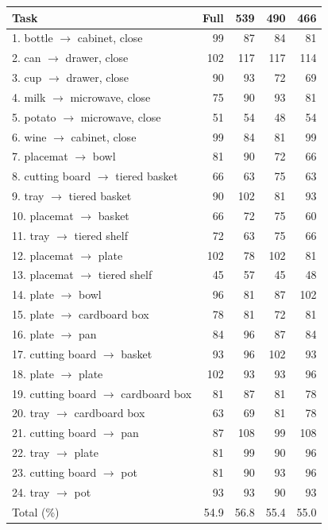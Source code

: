   \vspace{4pt}
  \begin{subtable}[t]{\linewidth}
    \centering
    \caption{RoboCasa-GR1 (DiT4DiT):150 episodes per task, three seeds evaluated.}
    \begin{tabular}{@{}lrrrr@{}}
    \toprule
    Task & Full & 539 & 490 & 466 \\
    \midrule
1. bottle $\rightarrow$ cabinet, close & 99 & 87 & 84 & 81 \\
2. can $\rightarrow$ drawer, close & 102 & 117 & 117 & 114 \\
3. cup $\rightarrow$ drawer, close & 90 & 93 & 72 & 69 \\
4. milk $\rightarrow$ microwave, close & 75 & 90 & 93 & 81 \\
5. potato $\rightarrow$ microwave, close & 51 & 54 & 48 & 54 \\
6. wine $\rightarrow$ cabinet, close & 99 & 84 & 81 & 99 \\
7. placemat $\rightarrow$ bowl & 81 & 90 & 72 & 66 \\
8. cutting board $\rightarrow$ tiered basket & 66 & 63 & 75 & 63 \\
9. tray $\rightarrow$ tiered basket & 90 & 102 & 81 & 93 \\
10. placemat $\rightarrow$ basket & 66 & 72 & 75 & 60 \\
11. tray $\rightarrow$ tiered shelf & 72 & 63 & 75 & 66 \\
12. placemat $\rightarrow$ plate & 102 & 78 & 102 & 81 \\
13. placemat $\rightarrow$ tiered shelf & 45 & 57 & 45 & 48 \\
14. plate $\rightarrow$ bowl & 96 & 81 & 87 & 102 \\
15. plate $\rightarrow$ cardboard box & 78 & 81 & 72 & 81 \\
16. plate $\rightarrow$ pan & 84 & 96 & 87 & 84 \\
17. cutting board $\rightarrow$ basket & 93 & 96 & 102 & 93 \\
18. plate $\rightarrow$ plate & 102 & 93 & 93 & 96 \\
19. cutting board $\rightarrow$ cardboard box & 81 & 87 & 81 & 78 \\
20. tray $\rightarrow$ cardboard box & 63 & 69 & 81 & 78 \\
21. cutting board $\rightarrow$ pan & 87 & 108 & 99 & 108 \\
22. tray $\rightarrow$ plate & 81 & 99 & 90 & 96 \\
23. cutting board $\rightarrow$ pot & 81 & 90 & 93 & 96 \\
24. tray $\rightarrow$ pot & 93 & 93 & 90 & 93 \\
    \midrule
    Total (\%) & 54.9 & 56.8 & 55.4 & 55.0 \\
    \bottomrule
  \end{tabular}
  \end{subtable}
\endgroup